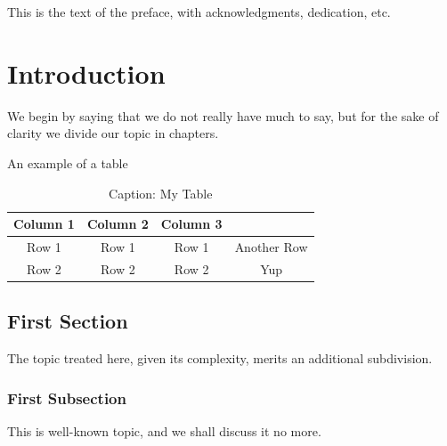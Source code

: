 \documentclass[hidelinks,pdftex,phd]{pittetd}
\begin{document}

This is the text of the preface, with acknowledgments, dedication, etc. 




\chapter{Introduction}%
We begin by saying that we do not really have much to say, but for the sake of clarity we divide our topic in chapters.

An example of a table
\begin{table}[h]
\centering
\caption{Caption: My Table}
\label{Reference: Title of my Table}
\begin{tabular}{|c|c|c|c|}
\hline
Column 1 & Column 2 & Column 3 &\\ \hline
Row 1 & Row 1 & Row 1 & Another Row\\ \hline
Row 2 & Row 2 & Row 2 & Yup\\ \hline
\end{tabular}
\end{table}

\section{First Section}
The topic treated here, given its complexity, merits an additional subdivision.


\subsection{First Subsection}
This is well-known topic, and we shall discuss it no more.
\end{document}
